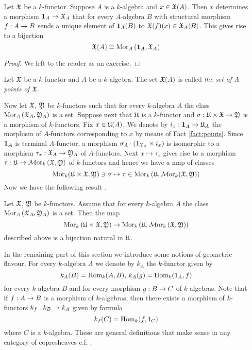 \begin{fact}\label{fact:points}
Let ${\mathfrak X}$ be a $k$-functor. Suppose $A$ is a $k$-algebra and $x\in {\mathfrak X}(A)$. Then $x$ determines a morphism $\mathbf{1}_{A}\rightarrow {\mathfrak X}_A$ that for every $A$-algebra $B$ with structural morphism $f:A\rightarrow B$ sends a unique element of $\mathbf{1}_{A}(B)$ to ${\mathfrak X}(f)(x)\in {\mathfrak X}_A(B)$. This gives rise to a bijection
$${\mathfrak X}(A)\cong \mathrm{Mor}_{A}\left(\mathbf{1}_{A},{\mathfrak X}_A\right)$$
\end{fact}
\begin{proof}
We left to the reader as an exercise.
\end{proof}

\begin{definition}
Let ${\mathfrak X}$ be a $k$-functor and $A$ be a $k$-algebra. The set ${\mathfrak X}(A)$ is called \textit{the set of $A$-points of ${\mathfrak X}$}.
\end{definition}
\noindent
Now let ${\mathfrak X}$, ${\mathfrak Y}$ be $k$-functors such that for every $k$-algebra $A$ the class $\mathrm{Mor}_A\left({\mathfrak X}_A,{\mathfrak Y}_A\right)$ is a set. Suppose next that ${\mathfrak U}$ is a $k$-functor and $\sigma:{\mathfrak U}\times {\mathfrak X}\rightarrow {\mathfrak Y}$ is a morphism of $k$-functors. Fix $x\in {\mathfrak U}(A)$. We denote by $i_x:\mathbf{1}_A\rightarrow {\mathfrak U}_A$ the morphism of $A$-functors corresponding to $x$ by means of Fact \ref{fact:points}. Since $\mathbf{1}_A$ is terminal $A$-functor, a morphism $\sigma_A\cdot \left(1_{{\mathfrak X}_A}\times i_x\right)$ is isomorphic to a morphism $\tau_x:{\mathfrak X}_A\rightarrow {\mathfrak Y}_A$ of $A$-functors. Next $x\mapsto \tau_x$ gives rise to a morphism $\tau:{\mathfrak U}\rightarrow \mathcal{M}\mathrm{or}_k\left({\mathfrak X},{\mathfrak Y}\right)$ of $k$-functors and hence we have a map of classes
$$\mathrm{Mor}_k({\mathfrak U}\times {\mathfrak X},{\mathfrak Y})\ni \sigma\mapsto \tau\in \mathrm{Mor}_k\left({\mathfrak U},\mathcal{M}\mathrm{or}_k({\mathfrak X},{\mathfrak Y})\right)$$
Now we have the following result {\cite[Theorem 5.3]{Presheaves}}.

\begin{theorem}\label{theorem:homforkfunctors}
Let ${\mathfrak X}$, ${\mathfrak Y}$ be $k$-functors. Assume that for every $k$-algebra $A$ the class $\mathrm{Mor}_{A}\left({\mathfrak X}_A,{\mathfrak Y}_A\right)$ is a set. Then the map 
$$\mathrm{Mor}_{k}\left({\mathfrak U}\times {\mathfrak X},{\mathfrak Y}\right)\rightarrow  \mathrm{Mor}_{k}\left({\mathfrak U},\mathcal{M}\mathrm{or}_{k}\left({\mathfrak X},{\mathfrak Y}\right)\right)$$
described above is a bijection natural in ${\mathfrak U}$. 
\end{theorem}
\noindent
In the remaining part of this section we introduce some notions of geometric flavour. For every $k$-algebra $A$ we denote by $k_A$ the $k$-functor given by
$$k_A(B) = \mathrm{Hom}_k(A,B),\,k_A(g) = \mathrm{Hom}_k(1_A,f)$$
for every $k$-algebra $B$ and for every morphism $g:B\rightarrow C$ of $k$-algebras. Note that if $f:A\rightarrow B$ is a morphism of $k$-algebras, then there exists a morphism of $k$-functors $k_f:k_B\rightarrow k_A$ given by formula
$$k_f(C) = \mathrm{Hom}_k(f,1_C)$$
where $C$ is a $k$-algebra. These are general definitions that make sense in any category of copresheaves c.f. {\cite[section 7]{Presheaves}}.

